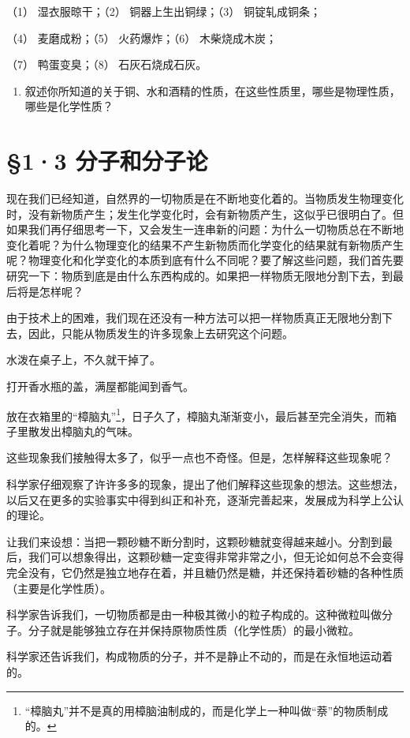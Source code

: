 （1） 湿衣服晾干；（2） 铜器上生出铜绿；（3） 铜锭轧成铜条；

（4） 麦磨成粉；（5） 火药爆炸；（6） 木柴烧成木炭；

（7） 鸭蛋变臭；（8） 石灰石烧成石灰。

\begin{enumerate}[start=4]
\item
  叙述你所知道的关于铜、水和酒精的性质，在这些性质里，哪些是物理性质，哪些是化学性质？
\end{enumerate}

\section{§1·3 分子和分子论}

现在我们已经知道，自然界的一切物质是在不断地变化着的。当物质发生物理变化时，没有新物质产生；发生化学变化时，会有新物质产生，这似乎已很明白了。但如果我们再仔细思考一下，又会发生一连串新的问题：为什么一切物质总在不断地变化着呢？为什么物理变化的结果不产生新物质而化学变化的结果就有新物质产生呢？物理变化和化学变化的本质到底有什么不同呢？要了解这些问题，我们首先要研究一下：物质到底是由什么东西构成的。如果把一样物质无限地分割下去，到最后将是怎样呢？

由于技术上的困难，我们现在还没有一种方法可以把一样物质真正无限地分割下去，因此，只能从物质发生的许多现象上去研究这个问题。

水泼在桌子上，不久就干掉了。

打开香水瓶的盖，满屋都能闻到香气。

放在衣箱里的``樟脑丸''\footnote{``樟脑丸''并不是真的用樟脑油制成的，而是化学上一种叫做``萘''的物质制成的。}，日子久了，樟脑丸渐渐变小，最后甚至完全消失，而箱子里散发出樟脑丸的气味。

这些现象我们接触得太多了，似乎一点也不奇怪。但是，怎样解释这些现象呢？

科学家仔细观察了许许多多的现象，提出了他们解释这些现象的想法。这些想法，以后又在更多的实验事实中得到纠正和补充，逐渐完善起来，发展成为科学上公认的理论。

让我们来设想：当把一颗砂糖不断分割时，这颗砂糖就变得越来越小。分割到最后，我们可以想象得出，这颗砂糖一定变得非常非常之小，但无论如何总不会变得完全没有，它仍然是独立地存在着，并且糖仍然是糖，并还保持着砂糖的各种性质（主要是化学性质）。

科学家告诉我们，一切物质都是由一种极其微小的粒子构成的。这种微粒叫做分子。分子就是能够独立存在并保持原物质性质（化学性质）的最小微粒。

科学家还告诉我们，构成物质的分子，并不是静止不动的，而是在永恒地运动着的。

